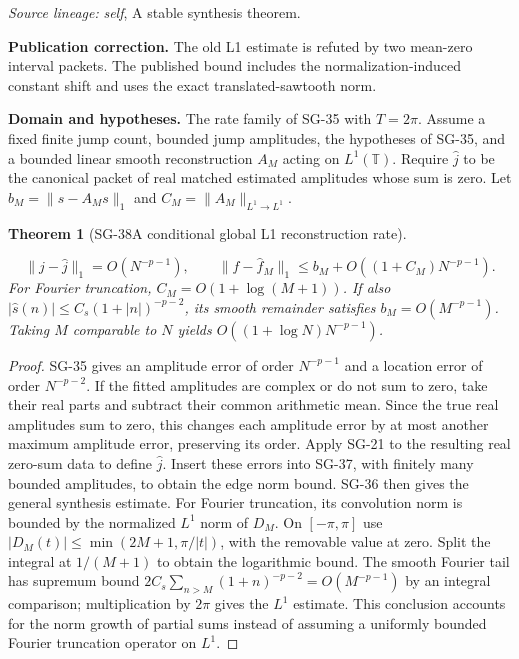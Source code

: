 \documentclass[11pt]{article}
\newtheorem{theorem}{Theorem}[section]
\theoremstyle{definition}\newtheorem{definition}[theorem]{Definition}
\theoremstyle{remark}\newtheorem{remark}[theorem]{Remark}
\begin{document}
\par{\small\color{Teal}\textit{Source lineage:} \textit{self}, A stable synthesis theorem.}\par

\par{\small\textbf{Publication correction.} The old L1 estimate is refuted by two mean-zero interval packets. The published bound includes the normalization-induced constant shift and uses the exact translated-sawtooth norm.}\par

\par{\small\textbf{Domain and hypotheses.} The rate family of SG-35 with $T=2\pi$. Assume a fixed finite jump count, bounded jump amplitudes, the hypotheses of SG-35, and a bounded linear smooth reconstruction $A_M$ acting on $L^1(\mathbb T)$. Require $\widehat j$ to be the canonical packet of real matched estimated amplitudes whose sum is zero. Let $b_M=\|s-A_Ms\|_1$ and $C_M=\|A_M\|_{L^1\to L^1}$.}\par
\begin{theorem}[SG-38\quad A conditional global L1 reconstruction rate]\label{SG-38}

\[
 \|j-\widehat j\|_1=O(N^{-p-1}),\qquad
 \|f-\widehat f_M\|_1\le b_M+O((1+C_M)N^{-p-1}).
\]
For Fourier truncation, $C_M=O(1+\log(M+1))$. If also
$|\widehat s(n)|\le C_s(1+|n|)^{-p-2}$, its smooth remainder satisfies
$b_M=O(M^{-p-1})$. Taking $M$ comparable to $N$ yields
$O((1+\log N)N^{-p-1})$.

\end{theorem}
\begin{proof}

SG-35 gives an amplitude error of order $N^{-p-1}$ and a location error of
order $N^{-p-2}$. If the fitted amplitudes are complex or do not sum to zero,
take their real parts and subtract their common arithmetic mean. Since the
true real amplitudes sum to zero, this changes each amplitude error by at
most another maximum amplitude error, preserving its order. Apply SG-21 to
the resulting real zero-sum data to define $\widehat j$. Insert these errors into SG-37, with finitely many bounded
amplitudes, to obtain the edge norm bound. SG-36 then gives the general
synthesis estimate.
For Fourier truncation, its convolution norm is bounded by the normalized
$L^1$ norm of $D_M$. On $[-\pi,\pi]$ use
$|D_M(t)|\le\min(2M+1,\pi/|t|)$, with the removable value at zero.
Split the integral at $1/(M+1)$ to obtain the logarithmic bound.
The smooth Fourier tail has supremum bound
$2C_s\sum_{n>M}(1+n)^{-p-2}=O(M^{-p-1})$ by an integral comparison;
multiplication by $2\pi$ gives the $L^1$ estimate.
This conclusion accounts for the norm growth of partial sums instead of
assuming a uniformly bounded Fourier truncation operator on $L^1$.

\end{proof}
\end{document}
